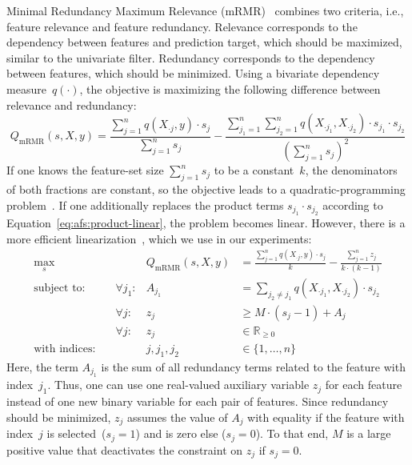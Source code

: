 \documentclass{article}
\theoremstyle{definition}
\begin{document}
Minimal Redundancy Maximum Relevance (mRMR)~\cite{peng2005feature} combines two criteria, i.e., feature relevance and feature redundancy.
Relevance corresponds to the dependency between features and prediction target, which should be maximized, similar to the univariate filter.
Redundancy corresponds to the dependency between features, which should be minimized.
Using a bivariate dependency measure~$q(\cdot)$, the objective is maximizing the following difference between relevance and redundancy:
%
\begin{equation}
	Q_{\text{mRMR}}(s,X,y) = \frac{\sum_{j=1}^{n} q(X_{\cdot{}j},y) \cdot s_j}{\sum_{j=1}^{n} s_j} - \frac{\sum_{j_1=1}^{n} \sum_{j_2=1}^{n} q(X_{\cdot{}j_1}, X_{\cdot{}j_2}) \cdot s_{j_1} \cdot s_{j_2}}{(\sum_{j=1}^{n} s_j)^2}
	\label{eq:afs:mrmr}
\end{equation}
%
If one knows the feature-set size $\sum_{j=1}^{n} s_j$ to be a constant~$k$, the denominators of both fractions are constant, so the objective leads to a quadratic-programming problem~\cite{nguyen2014effective, rodriguez2010quadratic}.
If one additionally replaces the product terms $s_{j_1} \cdot s_{j_2}$ according to Equation~\ref{eq:afs:product-linear}, the problem becomes linear.
However, there is a more efficient linearization~\cite{nguyen2009optimizing, nguyen2010towards}, which we use in our experiments:
%
\begin{equation}
	\begin{aligned}
		\max_s &\quad & Q_{\text{mRMR}}(s,X,y) &= \frac{\sum_{j=1}^{n} q(X_{\cdot{}j},y) \cdot s_j}{k} - \frac{\sum_{j=1}^{n} z_j}{k \cdot (k-1)} \\
		\text{subject to:} &\quad \forall j_1: & A_{j_1} &= \sum_{j_2 \neq j_1} q(X_{\cdot{}j_1}, X_{\cdot{}j_2}) \cdot s_{j_2} \\
		&\quad \forall j: & z_j &\geq M \cdot (s_j - 1) + A_j \\
		&\quad \forall j: & z_j &\in \mathbb{R}_{\geq 0} \\
		\text{with indices:} &\quad & j, j_1, j_2 &\in \{1, \dots, n\}
	\end{aligned}
	\label{eq:afs:mrmr-linear}
\end{equation}
%
Here, the term $A_{j_1}$ is the sum of all redundancy terms related to the feature with index~$j_1$.
Thus, one can use one real-valued auxiliary variable $z_j$ for each feature instead of one new binary variable for each pair of features.
Since redundancy should be minimized, $z_j$ assumes the value of $A_j$ with equality if the feature with index~$j$ is selected~($s_j=1$) and is zero else ($s_j=0$).
To that end, $M$ is a large positive value that deactivates the constraint on $z_j$ if $s_j=0$.
\end{document}
